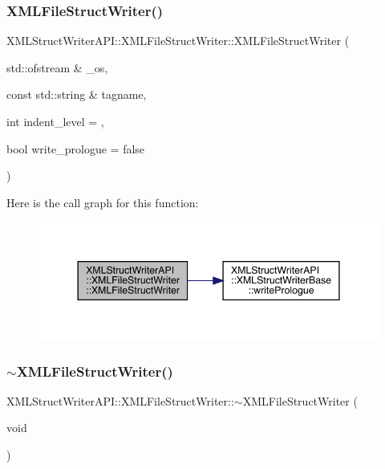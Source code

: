 \subsubsection{\texorpdfstring{XMLFileStructWriter()}{XMLFileStructWriter()}\hspace{0.1cm}{\footnotesize\ttfamily [3/3]}}
{\footnotesize\ttfamily X\+M\+L\+Struct\+Writer\+A\+P\+I\+::\+X\+M\+L\+File\+Struct\+Writer\+::\+X\+M\+L\+File\+Struct\+Writer (\begin{DoxyParamCaption}\item[{std\+::ofstream \&}]{\+\_\+os,  }\item[{const std\+::string \&}]{tagname,  }\item[{int}]{indent\+\_\+level = {},  }\item[{bool}]{write\+\_\+prologue = {\ttfamily false} }\end{DoxyParamCaption})\hspace{0.3cm}{\ttfamily [inline]}}

Here is the call graph for this function\+:
\nopagebreak
\begin{figure}[H]
\begin{center}
\leavevmode
\includegraphics[width=344pt]{db/de3/classXMLStructWriterAPI_1_1XMLFileStructWriter_a7045796a887cf66a8ee5a355a1f3c4a9_cgraph}
\end{center}
\end{figure}
\mbox{\label{classXMLStructWriterAPI_1_1XMLFileStructWriter_a28ac83ac02b6b4e4e67f9a767320155d}} 
\subsubsection{\texorpdfstring{$\sim$XMLFileStructWriter()}{~XMLFileStructWriter()}\hspace{0.1cm}{\footnotesize\ttfamily [3/3]}}
{\footnotesize\ttfamily X\+M\+L\+Struct\+Writer\+A\+P\+I\+::\+X\+M\+L\+File\+Struct\+Writer\+::$\sim$\+X\+M\+L\+File\+Struct\+Writer (\begin{DoxyParamCaption}\item[{void}]{ }\end{DoxyParamCaption})\hspace{0.3cm}{\ttfamily [inline]}}



